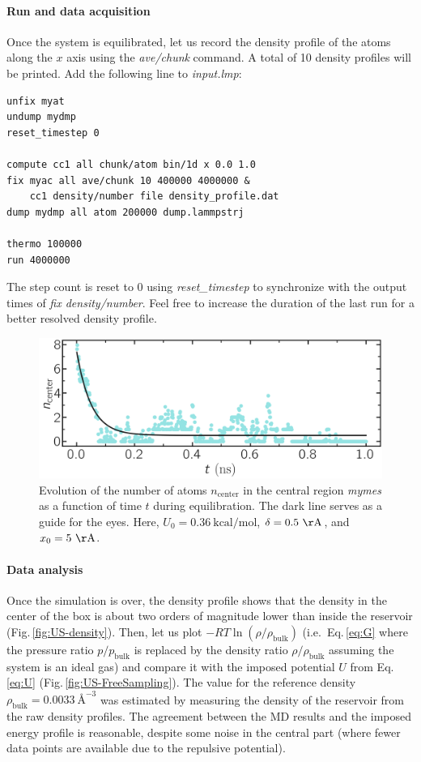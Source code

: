\documentclass[9pt,tutorial]{livecoms}
\begin{document}
\paragraph{Run and data acquisition}
Once the system is equilibrated, let us record the density profile of
the atoms along the $x$ axis using
the \textit{ave/chunk} command. A total of 10 density profiles will be printed.
Add the following line to \textit{input.lmp}:
\begin{lstlisting}
unfix myat
undump mydmp
reset_timestep 0

compute cc1 all chunk/atom bin/1d x 0.0 1.0
fix myac all ave/chunk 10 400000 4000000 &
    cc1 density/number file density_profile.dat
dump mydmp all atom 200000 dump.lammpstrj

thermo 100000
run 4000000
\end{lstlisting}
The step count is reset to 0 using \textit{reset\_timestep} to synchronize
with the output times of \textit{fix density/number}. Feel free to increase the
duration of the last run for a better resolved density profile.

\begin{figure}
\centering
\includegraphics[width=\linewidth]{US-density-evolution}
\caption{Evolution of the number of atoms $n_\text{center}$ in the central
region \textit{mymes} as a function of time $t$ during equilibration. The dark line
serves as a guide for the eyes. Here, $U_0 = 0.36~\text{kcal/mol}$,
$\delta = 0.5~\mathrm{\AA{}}$, and $x_0 = 5~\mathrm{\AA{}}$.}
\label{fig:US-density-evolution}
\end{figure}

\paragraph{Data analysis}

Once the simulation is over, the density profile shows that the density in the center of the box is
about two orders of magnitude lower than inside the reservoir (Fig.\,\ref{fig:US-density}).
Then, let us plot $-R T \ln(\rho/\rho_\mathrm{bulk})$ (i.e.~Eq.\,\eqref{eq:G} where
the pressure ratio $p/p_\mathrm{bulk}$ is replaced by the density ratio
$\rho/\rho_\mathrm{bulk}$ assuming the system is an ideal gas) and compare it
with the imposed potential $U$ from Eq.\,\eqref{eq:U} (Fig.\,\ref{fig:US-FreeSampling}).
The value for the reference density $\rho_\text{bulk} = 0.0033~\text{\AA{}}^{-3}$
was estimated by measuring the density of the reservoir from the raw density
profiles. The agreement between the MD results and the imposed energy profile
is reasonable, despite some noise in the central part (where fewer data points
are available due to the repulsive potential).
\end{document}
